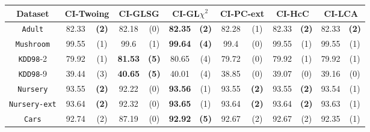 \begin{table}
\scriptsize
\centering
\begin{tabular}{c|cc|cc|cc|cc|cc|cc} 
Dataset             & \multicolumn{2}{c|}{CI-Twoing} &   \multicolumn{2}{c|}{CI-GLSG} & \multicolumn{2}{c|}{CI-GL$\chi^2$} & \multicolumn{2}{c|}{CI-PC-ext}& \multicolumn{2}{c|}{CI-HcC}& \multicolumn{2}{c}{CI-LCA}\\
\hline   
{\tt Adult}         & 82.33      &  {\bf (2)}        &   82.18      & (0)             & {\bf 82.35} &  {\bf (2)}           & 82.28       & (1)             & 82.33       & {\bf (2)}   & 82.33       & {\bf (2)}   \\
{\tt Mushroom}      & 99.55      &  (1)              &   99.6       & (1)             & {\bf 99.64} &  {\bf (4)}           & 99.4        & (0)             & 99.55       & (1)         & 99.55       & (1)         \\
{\tt KDD98}-2       & 79.92      &  (1)              &  {\bf 81.53} & {\bf (5)}       &  80.65      &  (4)                 & 79.72       & (0)             & 79.92       & (1)         & 79.92       & (1)         \\
{\tt KDD98}-9       & 39.44      &  (3)              &  {\bf 40.65} & {\bf (5)}       &  40.01      &  (4)                 & 38.85       & (0)             & 39.07       & (0)         & 39.16       & (0)         \\
{\tt Nursery}       & 93.55      &  {\bf (2)}        &   92.22      & (0)             & {\bf 93.56} &  (1)                 & 93.55       & {\bf (2)}       & 93.55       & {\bf (2)}   & 93.54       & (1)         \\
{\tt Nursery-ext}   & 93.64      &  {\bf (2)}        &   92.32      & (0)             & {\bf 93.65} &  (1)                 & 93.64       & {\bf (2)}       & 93.64       & {\bf (2)}   & 93.63       & (1)         \\
{\tt Cars}          & 92.74      &  (2)              &   87.19      & (0)             & {\bf 92.92} &  {\bf (5)}           & 92.67       & (2)             & 92.67       & (2)         & 92.35       & (1)         \\

\end{tabular}
\end{table}
